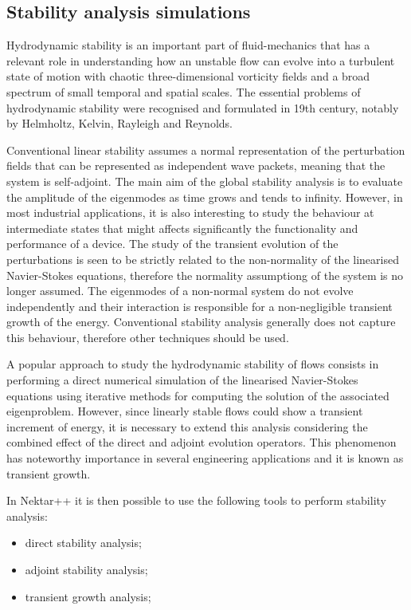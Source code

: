 \newpage



\subsection{Stability analysis simulations}

Hydrodynamic stability is an important part of fluid-mechanics that has a relevant role in understanding how an unstable flow can evolve into a turbulent state of motion with chaotic three-dimensional vorticity fields and a broad spectrum of small temporal and spatial scales. The essential problems of hydrodynamic stability were recognised and formulated in 19th century, notably by Helmholtz, Kelvin, Rayleigh and Reynolds.

Conventional linear stability assumes a normal representation of the perturbation fields that can be represented as independent wave packets, meaning that the system is self-adjoint. The main aim of the global stability analysis is to evaluate the amplitude of the eigenmodes as time grows and tends to infinity. However, in most industrial applications, it is also interesting to study the behaviour at intermediate states that might affects significantly the functionality and performance of a device. The study of the transient evolution of the perturbations is seen to be strictly related to the non-normality of the linearised Navier-Stokes equations, therefore the normality assumptiong of the system is no longer assumed. The eigenmodes of a non-normal system do not evolve independently and their interaction is responsible for a non-negligible transient growth of the energy. Conventional stability analysis generally does not capture this behaviour, therefore other techniques should be used.

A popular approach to study the hydrodynamic stability of flows consists in performing a direct numerical simulation of the linearised Navier-Stokes equations using iterative methods for computing the solution of the associated eigenproblem. However, since linearly stable flows could show a transient increment of energy, it is necessary to extend this analysis considering the combined effect of the direct and adjoint evolution operators. This phenomenon has noteworthy importance in several engineering applications and it is known as transient growth.

In Nektar++ it is then possible to use the following tools to perform stability analysis: 

\begin{itemize}
\item direct stability analysis;
\item adjoint stability analysis;
\item  transient growth analysis;
\end{itemize}

